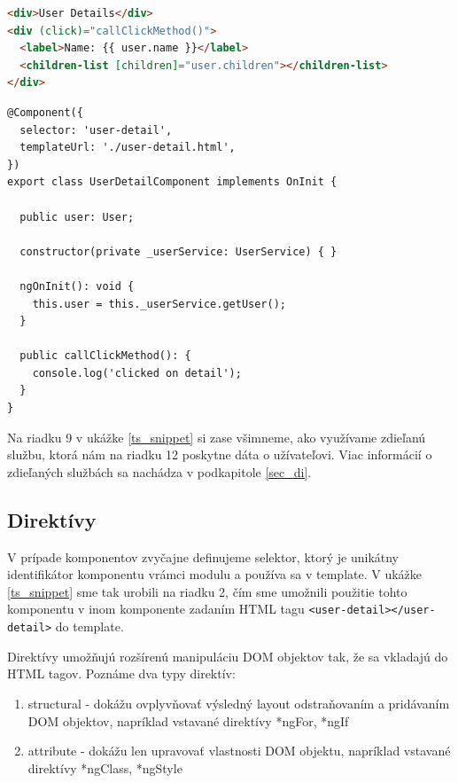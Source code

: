 \documentclass[
  digital, %
  twoside, %
  notable,   %
  nolof,   %
  nolot,   %
]{fithesis3}
\begin{document}
\begin{lstlisting}[language=HTML,caption={HTML template \textit{user-detail.html}},captionpos=b,label=html_snippet]
<div>User Details</div>
<div (click)="callClickMethod()">
  <label>Name: {{ user.name }}</label>
  <children-list [children]="user.children"></children-list>
</div>
\end{lstlisting}

\begin{lstlisting}[caption={Komponent UserDetail},captionpos=b,label=ts_snippet]
@Component({
  selector: 'user-detail',
  templateUrl: './user-detail.html',
})
export class UserDetailComponent implements OnInit {

  public user: User;

  constructor(private _userService: UserService) { }

  ngOnInit(): void {
    this.user = this._userService.getUser();
  }
  
  public callClickMethod(): {
    console.log('clicked on detail');
  }
}
\end{lstlisting}

Na riadku 9 v ukážke \ref{ts_snippet} si zase všimneme, ako využívame zdieľanú službu, ktorá nám na riadku 12 poskytne dáta o užívateľovi. Viac informácií o zdieľaných službách sa nachádza v podkapitole \ref{sec_di}.

\subsection{Direktívy}
\label{sec_directives}
V prípade komponentov zvyčajne definujeme selektor, ktorý je unikátny identifikátor komponentu vrámci modulu a používa sa v template. V ukážke \ref{ts_snippet} sme tak urobili na riadku 2, čím sme umožnili použitie tohto komponentu v inom komponente zadaním HTML tagu \texttt{<user-detail></user-detail>} do template.

Direktívy umožňujú rozšírenú manipuláciu DOM objektov tak, že sa vkladajú do HTML tagov. Poznáme dva typy direktív\cite{angular}:
\begin{enumerate}
\item structural - dokážu ovplyvňovať výsledný layout odstraňovaním a pridávaním DOM objektov, napríklad vstavané direktívy *ngFor, *ngIf
\item attribute - dokážu len upravovať vlastnosti DOM objektu, napríklad vstavané direktívy *ngClass, *ngStyle
\end{enumerate}
\end{document}

